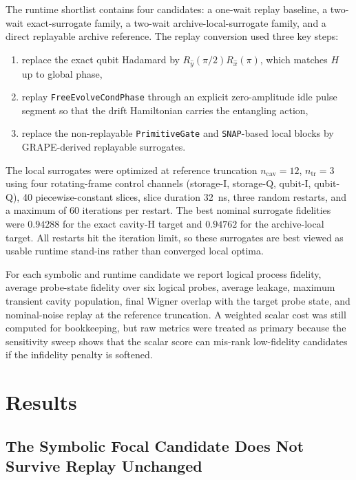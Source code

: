 \documentclass[aps,pra,twocolumn,reprint,amsmath,amssymb]{revtex4-2}
\begin{document}
The runtime shortlist contains four candidates: a one-wait replay baseline, a
two-wait exact-surrogate family, a two-wait archive-local-surrogate family, and
a direct replayable archive reference. The replay conversion used three key
steps:
\begin{enumerate}
  \item replace the exact qubit Hadamard by
  $R_{\hat y}(\pi/2) R_{\hat x}(\pi)$, which matches $H$ up to global phase,
  \item replay \texttt{FreeEvolveCondPhase} through an explicit zero-amplitude
  idle pulse segment so that the drift Hamiltonian carries the entangling action,
  \item replace the non-replayable \texttt{PrimitiveGate} and \texttt{SNAP}-based
  local blocks by GRAPE-derived replayable surrogates.
\end{enumerate}

The local surrogates were optimized at reference truncation
$n_{\mathrm{cav}} = 12$, $n_{\mathrm{tr}} = 3$ using four rotating-frame control
channels (storage-I, storage-Q, qubit-I, qubit-Q), 40 piecewise-constant slices,
slice duration \SI{32}{ns}, three random restarts, and a maximum of 60
iterations per restart. The best nominal surrogate fidelities were $0.94288$ for
the exact cavity-H target and $0.94762$ for the archive-local target. All
restarts hit the iteration limit, so these surrogates are best viewed as usable
runtime stand-ins rather than converged local optima.

For each symbolic and runtime candidate we report logical process fidelity,
average probe-state fidelity over six logical probes, average leakage, maximum
transient cavity population, final Wigner overlap with the target probe state,
and nominal-noise replay at the reference truncation. A weighted scalar cost was
still computed for bookkeeping, but raw metrics were treated as primary because
the sensitivity sweep shows that the scalar score can mis-rank low-fidelity
candidates if the infidelity penalty is softened.

\section{Results}

\subsection{The Symbolic Focal Candidate Does Not Survive Replay Unchanged}
\end{document}
